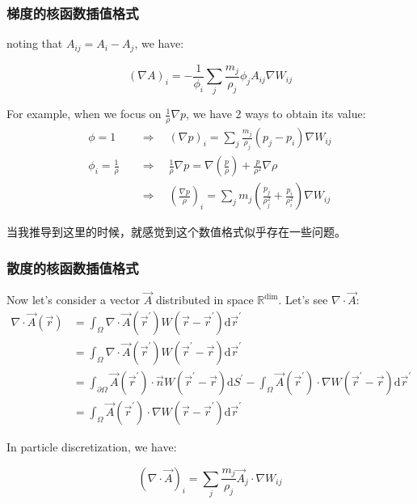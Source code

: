 \begin{frame}
    \frametitle{梯度的核函数插值格式}

    noting that $A_{ij} = A_i - A_j$, we have:

\begin{equation}
    (\nabla A)_i = -\frac{1}{\phi_i}\sum_j \frac{m_j}{\rho_j}\phi_j A_{ij} \nabla W_{ij}
\end{equation}

For example, when we focus on $\frac{1}{\rho}\nabla p$, 
we have 2 ways to obtain its value:
\begin{equation}
    \begin{aligned}
        \phi = 1 \quad &\Rightarrow \quad 
            (\nabla p)_i = \sum_j \frac{m_j}{\rho_j} (p_j-p_i) \nabla W_{ij} \\
        \phi_i = \frac{1}{\rho} \quad &\Rightarrow \quad 
            \frac{1}{\rho}\nabla p = \nabla \left(
                \frac{p}{\rho}
            \right)+
            \frac{p}{\rho^2}\nabla \rho\\
            &\Rightarrow\quad
            \left(\frac{\nabla p}{\rho}\right)_i=
            \sum_j m_j \left(
                \frac{p_j}{\rho_j^2}+\frac{p_i}{\rho_i^2}
            \right) \nabla W_{ij}
    \end{aligned}
\end{equation}

当我推导到这里的时候，就感觉到这个数值格式似乎存在一些问题。

\end{frame}

\begin{frame}
    \frametitle{散度的核函数插值格式}
    Now let's consider a vector $\vec{A}$ distributed in space $\mathbb{R}^\text{dim}$.
    Let's see $\nabla\cdot\vec{A}$:
    \begin{equation}
        \begin{aligned}
            \nabla\cdot\vec{A}(\vec{r}) &= \int_{\Omega} \nabla\cdot\vec{A}(\vec{r}^\prime) W(\vec{r} - \vec{r}^\prime) \mathrm{d}\vec{r}^\prime \\
            &= \int_{\Omega} \nabla\cdot\vec{A}(\vec{r}^\prime) W(\vec{r}^\prime - \vec{r}) \mathrm{d}\vec{r}^\prime \\
            &= \int_{\partial \Omega} \vec{A}(\vec{r}^\prime) \cdot \vec{n} W(\vec{r}^\prime - \vec{r}) \mathrm{d}S^\prime -
            \int_{\Omega} \vec{A}(\vec{r}^\prime) \cdot \nabla W(\vec{r}^\prime - \vec{r}) \mathrm{d}\vec{r}^\prime\\
            &= \int_{\Omega} \vec{A}(\vec{r}^\prime) \cdot \nabla W(\vec{r} - \vec{r}^\prime) \mathrm{d}\vec{r}^\prime
        \end{aligned}
    \end{equation}
    
    In particle discretization, we have:
    
    \begin{equation}
        (\nabla\cdot\vec{A})_i = \sum_{j} \frac{m_j}{\rho_j} \vec{A}_j \cdot \nabla W_{ij}
    \end{equation}
    
\end{frame}

